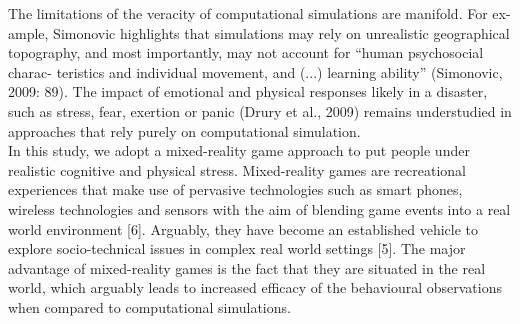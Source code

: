 The limitations of the veracity of computational simulations are manifold. For ex- ample, Simonovic highlights that simulations may rely on unrealistic geographical topography, and most importantly, may not account for “human psychosocial charac- teristics and individual movement, and (...) learning ability” (Simonovic, 2009: 89). The impact of emotional and physical responses likely in a disaster, such as stress, fear, exertion or panic (Drury et al., 2009) remains understudied in approaches that rely purely on computational simulation.\\


In this study, we adopt a mixed-reality game approach to put people under realistic cognitive and physical stress. Mixed-reality games are recreational experiences that make use of pervasive technologies such as smart phones, wireless technologies and sensors with the aim of blending game events into a real world environment [6]. Arguably, they have become an established vehicle to explore socio-technical issues in complex real world settings [5]. The major advantage of mixed-reality games is the fact that they are situated in the real world, which arguably leads to increased efficacy of the behavioural observations when compared to computational simulations.\\



